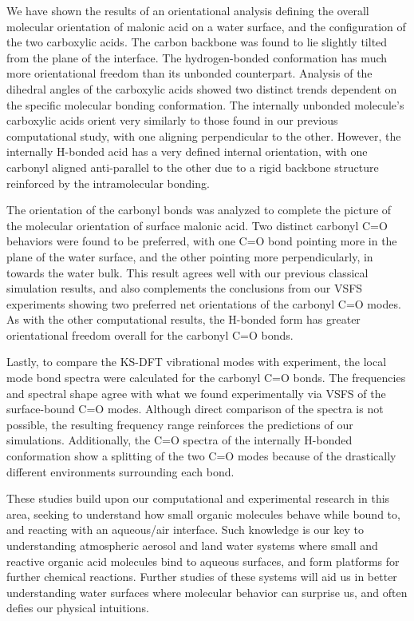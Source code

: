 We have shown the results of an orientational analysis defining the overall molecular orientation of malonic acid on a water surface, and the configuration of the two carboxylic acids. The carbon backbone was found to lie slightly tilted from the plane of the interface. The hydrogen-bonded conformation has much more orientational freedom than its unbonded counterpart. Analysis of the dihedral angles of the carboxylic acids showed two distinct trends dependent on the specific molecular bonding conformation. The internally unbonded molecule's carboxylic acids orient very similarly to those found in our previous computational study, with one aligning perpendicular to the other. However, the internally H-bonded acid has a very defined internal orientation, with one carbonyl aligned anti-parallel to the other due to a rigid backbone structure reinforced by the intramolecular bonding.

The orientation of the carbonyl bonds was analyzed to complete the picture of the molecular orientation of surface malonic acid. Two distinct carbonyl C=O behaviors were found to be preferred, with one C=O bond pointing more in the plane of the water surface, and the other pointing more perpendicularly, in towards the water bulk. This result agrees well with our previous classical simulation results, and also complements the conclusions from our VSFS experiments showing two preferred net orientations of the carbonyl C=O modes. As with the other computational results, the H-bonded form has greater orientational freedom overall for the carbonyl C=O bonds.

Lastly, to compare the KS-DFT vibrational modes with experiment, the local mode bond spectra were calculated for the carbonyl C=O bonds. The frequencies and spectral shape agree with what we found experimentally via VSFS of the surface-bound C=O modes. Although direct comparison of the spectra is not possible, the resulting frequency range reinforces the predictions of our simulations. Additionally, the C=O spectra of the internally H-bonded conformation show a splitting of the two C=O modes because of the drastically different environments surrounding each bond.

These studies build upon our computational and experimental research in this area, seeking to understand how small organic molecules behave while bound to, and reacting with an aqueous/air interface. Such knowledge is our key to understanding atmospheric aerosol and land water systems where small and reactive organic acid molecules bind to aqueous surfaces, and form platforms for further chemical reactions. Further studies of these systems will aid us in better understanding water surfaces where molecular behavior can surprise us, and often defies our physical intuitions.
